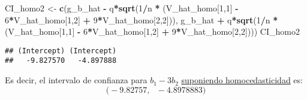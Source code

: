 \documentclass[
]{article}
\newenvironment{Shaded}{\begin{snugshade}}{\end{snugshade}}
\newcommand{\DecValTok}[1]{\textcolor[rgb]{0.00,0.00,0.81}{#1}}
\newcommand{\FunctionTok}[1]{\textcolor[rgb]{0.13,0.29,0.53}{\textbf{#1}}}
\newcommand{\NormalTok}[1]{#1}
\newcommand{\OtherTok}[1]{\textcolor[rgb]{0.56,0.35,0.01}{#1}}
\newcommand{\SpecialCharTok}[1]{\textcolor[rgb]{0.81,0.36,0.00}{\textbf{#1}}}
\begin{document}
\begin{Shaded}
\begin{Highlighting}[]
\NormalTok{CI\_homo2 }\OtherTok{\textless{}{-}} \FunctionTok{c}\NormalTok{(g\_b\_hat }\SpecialCharTok{{-}}\NormalTok{ q}\SpecialCharTok{*}\FunctionTok{sqrt}\NormalTok{(}\DecValTok{1}\SpecialCharTok{/}\NormalTok{n }\SpecialCharTok{*}\NormalTok{ (V\_hat\_homo[}\DecValTok{1}\NormalTok{,}\DecValTok{1}\NormalTok{] }\SpecialCharTok{{-}} \DecValTok{6}\SpecialCharTok{*}\NormalTok{V\_hat\_homo[}\DecValTok{1}\NormalTok{,}\DecValTok{2}\NormalTok{] }\SpecialCharTok{+} \DecValTok{9}\SpecialCharTok{*}\NormalTok{V\_hat\_homo[}\DecValTok{2}\NormalTok{,}\DecValTok{2}\NormalTok{])),}
\NormalTok{        g\_b\_hat }\SpecialCharTok{+}\NormalTok{ q}\SpecialCharTok{*}\FunctionTok{sqrt}\NormalTok{(}\DecValTok{1}\SpecialCharTok{/}\NormalTok{n }\SpecialCharTok{*}\NormalTok{ (V\_hat\_homo[}\DecValTok{1}\NormalTok{,}\DecValTok{1}\NormalTok{] }\SpecialCharTok{{-}} \DecValTok{6}\SpecialCharTok{*}\NormalTok{V\_hat\_homo[}\DecValTok{1}\NormalTok{,}\DecValTok{2}\NormalTok{] }\SpecialCharTok{+} \DecValTok{9}\SpecialCharTok{*}\NormalTok{V\_hat\_homo[}\DecValTok{2}\NormalTok{,}\DecValTok{2}\NormalTok{])))}
\NormalTok{CI\_homo2}
\end{Highlighting}
\end{Shaded}

\begin{verbatim}
## (Intercept) (Intercept) 
##   -9.827570   -4.897888
\end{verbatim}

Es decir, el intervalo de confianza para \(b_1 - 3b_2\)
\underline{suponiendo homocedasticidad} es: \[
\Big(-9.82757 , \ \ \ -4.8978883\Big)
\]
\end{document}

